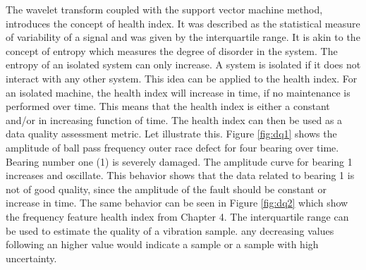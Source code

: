 \documentclass[../Main/thesis.tex]{subfiles}
\begin{document}
	\justify
	The wavelet transform coupled with the support vector machine method, introduces the concept of health index. It was described as the statistical measure of variability of a signal and was given by the interquartile range. It is akin to the concept of entropy which measures the degree of disorder in the system. The entropy of an isolated system can only increase. A system is isolated if it does not interact with any other system. This idea can be applied to the health index. For an isolated machine, the health index will increase in time, if no maintenance is performed over time. This means that the health index is either a constant and/or in increasing function of time. The health index can then be used as a data quality assessment metric. Let illustrate this.
	\justify
	 Figure \ref{fig:dq1} shows the amplitude of ball pass frequency outer race defect for four bearing over time. Bearing number one (1) is severely damaged. The amplitude curve for bearing 1 increases and oscillate. This behavior shows that the data related to bearing 1 is not of good quality, since the amplitude of the fault should be constant or increase in time. The same behavior can be seen in Figure \ref{fig:dq2} which show the frequency feature health index from Chapter 4. The interquartile range can be used to estimate the quality of a vibration sample. any decreasing values following an higher value would indicate a  sample or a sample with high uncertainty. 
	
\end{document}
